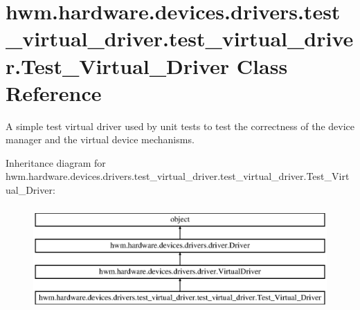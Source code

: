 \hypertarget{classhwm_1_1hardware_1_1devices_1_1drivers_1_1test__virtual__driver_1_1test__virtual__driver_1_1_test___virtual___driver}{\section{hwm.\-hardware.\-devices.\-drivers.\-test\-\_\-virtual\-\_\-driver.\-test\-\_\-virtual\-\_\-driver.\-Test\-\_\-\-Virtual\-\_\-\-Driver Class Reference}
\label{classhwm_1_1hardware_1_1devices_1_1drivers_1_1test__virtual__driver_1_1test__virtual__driver_1_1_test___virtual___driver}
}


A simple test virtual driver used by unit tests to test the correctness of the device manager and the virtual device mechanisms.  


Inheritance diagram for hwm.\-hardware.\-devices.\-drivers.\-test\-\_\-virtual\-\_\-driver.\-test\-\_\-virtual\-\_\-driver.\-Test\-\_\-\-Virtual\-\_\-\-Driver\-:\begin{figure}[H]
\begin{center}
\leavevmode
\includegraphics[height=4.000000cm]{classhwm_1_1hardware_1_1devices_1_1drivers_1_1test__virtual__driver_1_1test__virtual__driver_1_1_test___virtual___driver}
\end{center}
\end{figure}
